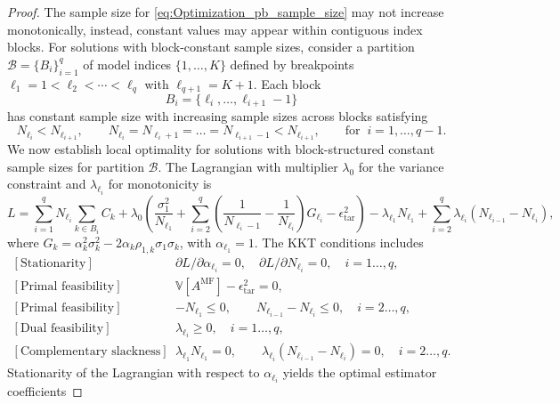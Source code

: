 \begin{proof}
The sample size for \eqref{eq:Optimization_pb_sample_size} may not increase monotonically, instead, constant values may appear within contiguous index blocks. For solutions with block-constant sample sizes, consider a partition $\mathscr{B} = \{B_i\}_{i=1}^q$ of model indices $\{1,\ldots,K\}$ defined by breakpoints $\ell_1=1 < \ell_2 < \cdots < \ell_q$ with $\ell_{q+1} = K+1$. Each block 
% 
\[
B_i = \{\ell_i, \ldots, \ell_{i+1}-1\}
\]
%
has constant sample size with increasing sample sizes across blocks satisfying
%
\begin{equation}\label{eq:sample_size_block}
    N_{\ell_i} < N_{\ell_{i+1}},\quad\quad  N_{\ell_i}=N_{\ell_i+1}=\ldots = N_{\ell_{i+1}-1} <N_{\ell_{i+1}}, \qquad \text{for}\;\;  i=1,\ldots,q-1.
\end{equation}
%
We now establish local optimality for solutions with block-structured constant sample sizes for partition $\mathscr{B}$. The Lagrangian with multiplier $\lambda_0$ for the variance constraint and $\lambda_{\ell_i}$ for monotonicity is
%
\begin{equation*}
L= \sum_{i=1}^q N_{\ell_i}\sum_{k\in B_i} C_k +\lambda_0 \left(\frac{\sigma_1^2}{N_{\ell_1}} + \sum_{i=2}^q \left(\frac{1}{N_{\ell_i-1}} - \frac{1}{N_{\ell_i}}\right)G_{\ell_i}- \epsilon_{\text{tar}}^2\right)-\lambda_{\ell_1} N_{\ell_1}+\sum_{i=2}^q\lambda_{\ell_{i}}(N_{\ell_{i-1}} - N_{\ell_{i}}),
\end{equation*}
%
where $G_k = \alpha_k^2\sigma_k^2 - 2\alpha_k\rho_{1,k}\sigma_1\sigma_k$, with $\alpha_{\ell_1} = 1$.
The KKT conditions includes
%
\[
\begin{array}{ll}
\left[\text{Stationarity}\right]&\partial L/\partial \alpha_{\ell_i}=0,\quad \partial L/{\partial N_{\ell_i}}=0,\quad i=1\ldots,q,\\
\left[\text{Primal feasibility}\right]&\mathbb{V}\left[A^{\text{MF}}\right]- \epsilon_{\text{tar}}^2 = 0, \\ 
\left[\text{Primal feasibility}\right] &-N_{\ell_1}\le 0,\qquad N_{\ell_{i-1}}-N_{\ell_i} \le 0, \quad i=2\ldots,q,\\ 
\left[\text{Dual feasibility}\right]  &\lambda_{\ell_i} \ge 0,\quad i=1\ldots,q, \\ 
\left[\text{Complementary slackness}\right]  &\lambda_{\ell_1} N_{\ell_1}=0,\qquad\lambda_{\ell_i}(N_{\ell_{i-1}}-N_{\ell_i})=0,\quad i=2\ldots,q.
\end{array}
\]
%
Stationarity of the Lagrangian with respect to $\alpha_{\ell_i}$ yields the optimal estimator coefficients

\end{proof}
